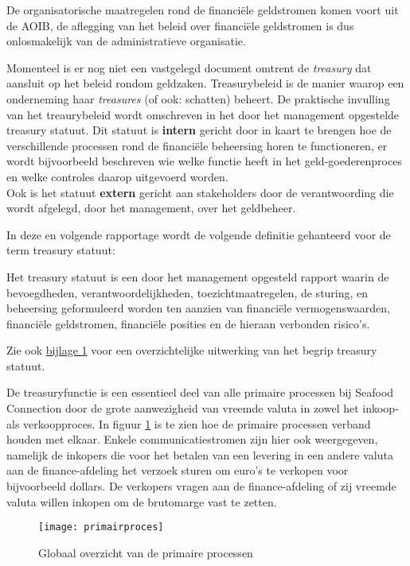 De organisatorische maatregelen rond de financiële geldstromen komen voort uit de AOIB, de aflegging van het beleid over financiële geldstromen is dus onlosmakelijk van de administratieve organisatie. 

\newpage
Momenteel is er nog niet een vastgelegd document omtrent de \textit{treasury} dat aansluit op het beleid rondom geldzaken. Treasurybeleid is de manier waarop een onderneming haar \textit{treasures} (of ook: schatten) beheert. De praktische invulling van het treaurybeleid wordt omschreven in het door het management opgestelde treasury statuut. 
Dit statuut is \textbf{intern} gericht door in kaart te brengen hoe de verschillende processen rond de financiële beheersing horen te functioneren, er wordt bijvoorbeeld beschreven wie welke functie heeft in het geld-goederenproces en welke controles daarop uitgevoerd worden. \\
Ook is het statuut \textbf{extern} gericht aan stakeholders door de verantwoording die wordt afgelegd, door het management, over het geldbeheer. \citep{jans}

In deze en volgende rapportage wordt de volgende definitie gehanteerd voor de term treasury statuut: 

\begin{displayquote}
Het treasury statuut is een door het management opgesteld rapport waarin de bevoegdheden, verantwoordelijkheden, toezichtmaatregelen, de sturing, en beheersing geformuleerd worden ten aanzien van financiële vermogenswaarden, financiële geldstromen, financiële posities en de hieraan verbonden risico’s. \\
\citep{jans,buunk} \label{def:treasury}
\end{displayquote}
\noindent
Zie ook \hyperlink{bij:treasury}{bijlage 1} voor een overzichtelijke uitwerking van het begrip treasury statuut.

\bigskip
De treasuryfunctie is een essentieel deel van alle primaire processen bij Seafood Connection door de grote aanwezigheid van vreemde valuta in zowel het inkoop- als verkoopproces. In figuur \ref{fig:primairproces} is te zien hoe de primaire processen verband houden met elkaar. Enkele communicatiestromen zijn hier ook weergegeven, namelijk de inkopers die voor het betalen van een levering in een andere valuta aan de finance-afdeling het verzoek sturen om euro's te verkopen voor bijvoorbeeld dollars. De verkopers vragen aan de finance-afdeling of zij vreemde valuta willen inkopen om de brutomarge vast te zetten.

\begin{figure}[!hb]
    \centering
    \texttt{[image: primairproces]}
    \caption{Globaal overzicht van de primaire processen}
    \label{fig:primairproces}
\end{figure}

